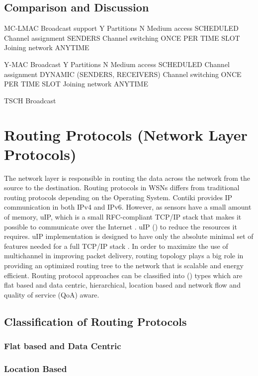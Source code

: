 \subsection{Comparison and Discussion}
MC-LMAC
Broadcast support Y
Partitions N
Medium access SCHEDULED
Channel assignment SENDERS
Channel switching ONCE PER TIME SLOT
Joining network ANYTIME

Y-MAC
Broadcast Y
Partitions N
Medium access SCHEDULED
Channel assignment DYNAMIC (SENDERS, RECEIVERS)
Channel switching ONCE PER TIME SLOT
Joining network ANYTIME

TSCH
Broadcast 

\section{Routing Protocols (Network Layer Protocols)}
The network layer is responsible in routing the data across the network from the source to the destination. Routing protocols in WSNs differs from traditional routing protocols depending on the Operating System.
Contiki provides IP communication in both IPv4 and IPv6. However, as sensors have a small amount of memory, uIP, which is a small RFC-compliant TCP/IP stack that makes it possible to communicate over the Internet \cite{contikiDoc, contikiUIP}. uIP () to reduce the resources it requires.
uIP implementation is designed to have only the absolute minimal set of features needed for a full TCP/IP stack \cite{contikiDoc, contikiUIP}.
In order to maximize the use of multichannel in improving packet delivery, routing topology plays a big role in providing an optimized routing tree to the network that is scalable and energy efficient. 
Routing protocol approaches can be classified into () types which are flat based and data centric, hierarchical, location based and network flow and quality of service (QoA) aware.


\subsection{Classification of Routing Protocols}

\subsubsection{Flat based and Data Centric}

\subsubsection{Location Based}

